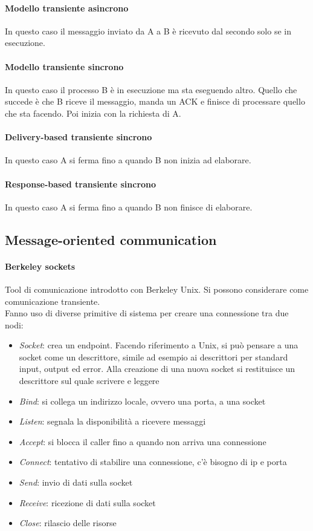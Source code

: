 \paragraph{Modello transiente asincrono}
In questo caso il messaggio inviato da A a B è ricevuto dal secondo 
solo se in esecuzione.

\paragraph{Modello transiente sincrono}
In questo caso il processo B è in esecuzione ma sta eseguendo altro.
Quello che succede è che B riceve il messaggio, manda un ACK e finisce di 
processare quello che sta facendo. Poi inizia con la richiesta di A.

\paragraph{Delivery-based transiente sincrono}
In questo caso A si ferma fino a quando B non inizia ad elaborare.

\paragraph{Response-based transiente sincrono}
In questo caso A si ferma fino a quando B non finisce di elaborare.

\subsection{Message-oriented communication}

\paragraph{Berkeley sockets}
Tool di comunicazione introdotto con Berkeley Unix. Si possono 
considerare come comunicazione transiente.\\
Fanno uso di diverse primitive di sistema per creare una connessione
tra due nodi:
\begin{itemize}
    \item \emph{Socket}: crea un endpoint. Facendo riferimento 
    a Unix, si può pensare a una socket come 
    un descrittore, simile ad esempio ai descrittori per standard input,
    output ed error. Alla creazione di una nuova socket si restituisce un descrittore
    sul quale scrivere e leggere
    \item \emph{Bind}: si collega un indirizzo locale, ovvero una porta, a una socket
    \item \emph{Listen}: segnala la disponibilità a ricevere messaggi
    \item \emph{Accept}: si blocca il caller fino a quando non arriva una connessione
    \item \emph{Connect}: tentativo di stabilire una connessione, c'è bisogno di ip 
    e porta
    \item \emph{Send}: invio di dati sulla socket
    \item \emph{Receive}: ricezione di dati sulla socket
    \item \emph{Close}: rilascio delle risorse
\end{itemize}

